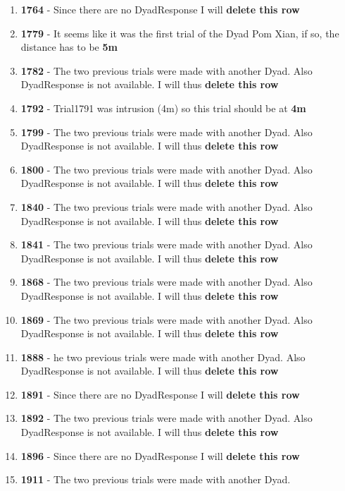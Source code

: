 \documentclass[
]{article}
\begin{document}
\begin{itemize}
\begin{enumerate}
{    row}
  \item
    \textbf{1764} - Since there are no DyadResponse I will
    \textbf{delete this row}
  \item
    \textbf{1779} - It seems like it was the first trial of the Dyad Pom
    Xian, if so, the distance has to be \textbf{5m}
  \item
    \textbf{1782} - The two previous trials were made with another Dyad.
    Also DyadResponse is not available. I will thus \textbf{delete this
    row}
  \item
    \textbf{1792} - Trial1791 was intrusion (4m) so this trial should be
    at \textbf{4m}
  \item
    \textbf{1799} - The two previous trials were made with another Dyad.
    Also DyadResponse is not available. I will thus \textbf{delete this
    row}
  \item
    \textbf{1800} - The two previous trials were made with another Dyad.
    Also DyadResponse is not available. I will thus \textbf{delete this
    row}
  \item
    \textbf{1840} - The two previous trials were made with another Dyad.
    Also DyadResponse is not available. I will thus \textbf{delete this
    row}
  \item
    \textbf{1841} - The two previous trials were made with another Dyad.
    Also DyadResponse is not available. I will thus \textbf{delete this
    row}
  \item
    \textbf{1868} - The two previous trials were made with another Dyad.
    Also DyadResponse is not available. I will thus \textbf{delete this
    row}
  \item
    \textbf{1869} - The two previous trials were made with another Dyad.
    Also DyadResponse is not available. I will thus \textbf{delete this
    row}
  \item
    \textbf{1888} - he two previous trials were made with another Dyad.
    Also DyadResponse is not available. I will thus \textbf{delete this
    row}
  \item
    \textbf{1891} - Since there are no DyadResponse I will
    \textbf{delete this row}
  \item
    \textbf{1892} - The two previous trials were made with another Dyad.
    Also DyadResponse is not available. I will thus \textbf{delete this
    row}
  \item
    \textbf{1896} - Since there are no DyadResponse I will
    \textbf{delete this row}
  \item
    \textbf{1911} - The two previous trials were made with another Dyad.

\end{enumerate}
\end{itemize}
\end{document}
